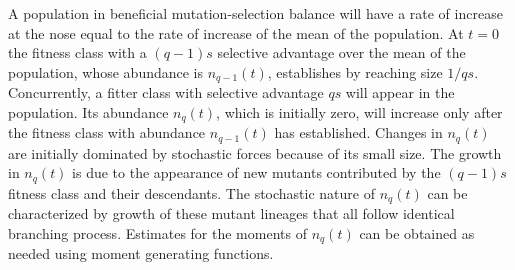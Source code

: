 \documentclass[12pt, one column]{article}
\begin{document}
A population in beneficial mutation-selection balance will have a rate of increase at the nose equal to the rate of increase of the mean of the population.  At $t=0$ the fitness class with a $(q-1)s$ selective advantage over the mean of the population, whose abundance is $n_{q-1}(t)$, establishes by reaching size $1/qs$.  Concurrently, a fitter class with selective advantage $qs$ will appear in the population.  Its abundance $n_q(t)$, which is initially zero, will increase only after the fitness class with abundance $n_{q-1}(t)$ has established.  Changes in $n_q(t)$ are initially dominated by stochastic forces because of its small size.  The growth in $n_q(t)$ is due to the appearance of new mutants contributed by the $(q-1)s$ fitness class and their descendants.  The stochastic nature of $n_q(t)$ can be characterized by growth of these mutant lineages that all follow identical branching process.  Estimates for the moments of $n_q(t)$ can be obtained as needed using moment generating functions.
\end{document}
